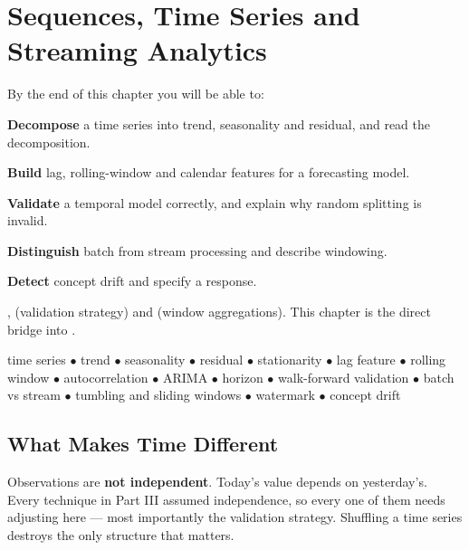 \chapter{Sequences, Time Series and Streaming Analytics}\label{ch:timeseries}

\begin{outcomes}
By the end of this chapter you will be able to:
\begin{tight}
  \item \textbf{Decompose} a time series into trend, seasonality and residual, and read the decomposition.
  \item \textbf{Build} lag, rolling-window and calendar features for a forecasting model.
  \item \textbf{Validate} a temporal model correctly, and explain why random splitting is invalid.
  \item \textbf{Distinguish} batch from stream processing and describe windowing.
  \item \textbf{Detect} concept drift and specify a response.
\end{tight}
\end{outcomes}

\begin{prereq}
,  (validation strategy) and
 (window aggregations). This chapter is the direct bridge into
.
\end{prereq}

\begin{keyterms}
time series $\bullet$ trend $\bullet$ seasonality $\bullet$ residual $\bullet$
stationarity $\bullet$ lag feature $\bullet$ rolling window $\bullet$
autocorrelation $\bullet$ ARIMA $\bullet$ horizon $\bullet$ walk-forward validation
$\bullet$ batch vs stream $\bullet$ tumbling and sliding windows $\bullet$
watermark $\bullet$ concept drift
\end{keyterms}

\section{What Makes Time Different}

\begin{alertbox}
Observations are \textbf{not independent}. Today's value depends on yesterday's.
Every technique in Part III assumed independence, so every one of them needs
adjusting here --- most importantly the validation strategy. Shuffling a time
series destroys the only structure that matters.
\end{alertbox}

